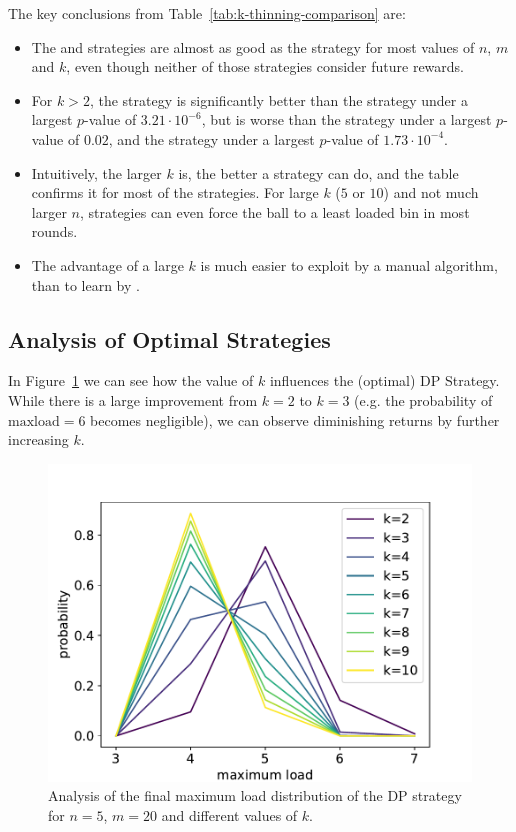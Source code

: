 The key conclusions from Table~\ref{tab:k-thinning-comparison} are:


\begin{itemize}
    \item
    The \Quantile and \LocalRewardOptimiser strategies are almost as good as the \DP strategy for most values of $n$, $m$ and $k$, even though neither of those strategies consider future rewards.
    \item
    For $k>2$, the \DQN strategy is significantly better than the \Threshold strategy under a largest $p$-value of $3.21\cdot 10^{-6}$, but is worse than the \Quantile strategy under a largest $p$-value of $0.02$, and the \LocalRewardOptimiser strategy under a largest $p$-value of $1.73\cdot 10^{-4}$.
    \item
    Intuitively, the larger $k$ is, the better a strategy can do, and the table confirms it for most of the strategies. For large $k$ ($5$ or $10$) and not much larger $n$, strategies can even force the ball to a least loaded bin in most rounds.
    \item
    The advantage of a large $k$ is much easier to exploit by a manual algorithm, than to learn by \DQL.
\end{itemize}


\subsection{Analysis of Optimal Strategies}


In Figure~\ref{k-thinning-dp-maxload} we can see how the value of $k$ influences the (optimal) DP Strategy. While there is a large improvement from $k=2$ to $k=3$ (e.g. the probability of $\mathrm{maxload}=6$ becomes negligible), we can observe diminishing returns by further increasing $k$.


\begin{figure}[h]
    \centering
    \includegraphics[scale=0.6]{Chapter4/Figs/k_thinning_max_load_distribution_5_20.pdf}
    \caption{Analysis of the final maximum load distribution of the DP strategy for $n=5$, $m=20$ and different values of $k$.}
    \label{k-thinning-dp-maxload}
\end{figure}

